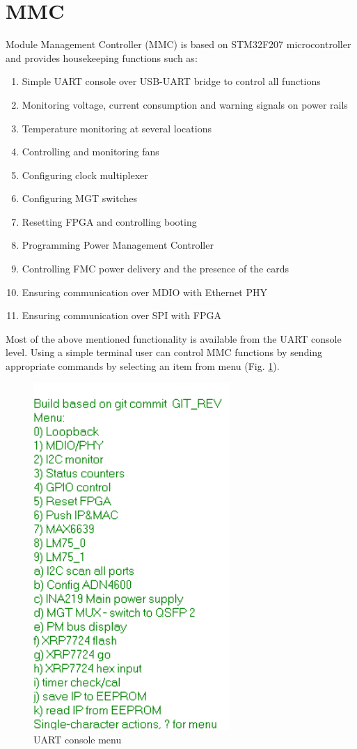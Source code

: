 \documentclass[12pt,oneside,a4]{article}
\begin{document}
\section{MMC}
Module Management Controller (MMC) is based on STM32F207 microcontroller and provides housekeeping functions such as:
\begin{enumerate}
	\item Simple UART console over USB-UART bridge to control all functions
	\item Monitoring voltage, current consumption and warning signals on power rails
	\item Temperature monitoring at several locations
	\item Controlling and monitoring fans
	\item Configuring clock multiplexer
	\item Configuring MGT switches
	\item Resetting FPGA and controlling booting
	\item Programming Power Management Controller
	\item Controlling FMC power delivery and the presence of the cards
	\item Ensuring communication over MDIO with Ethernet PHY
	\item Ensuring communication over SPI with FPGA
\end{enumerate}

Most of the above mentioned functionality is available from the UART console level. Using a simple terminal user can control MMC functions by sending appropriate commands by selecting an item from menu (Fig. \ref{menu}). 

\begin{figure}[H]
\begin{center}
\includegraphics[width=0.5\linewidth]{menu.png}
 \caption{UART console menu}\label{menu}
\end{center}
\end{figure}
\end{document}
